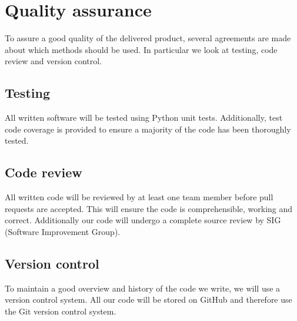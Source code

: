 \section{Quality assurance}

To assure a good quality of the delivered product, several agreements are made about which methods should be used. In particular we look at testing, code review and version control.

\subsection{Testing}
All written software will be tested using Python unit tests. Additionally, test code coverage is provided to ensure a majority of the code has been thoroughly tested.

\subsection{Code review}
All written code will be reviewed by at least one team member before pull requests are accepted. This will ensure the code is comprehensible, working and correct. Additionally our code will undergo a complete source review by SIG (Software Improvement Group).

\subsection{Version control}
To maintain a good overview and history of the code we write, we will use a version control system. All our code will be stored on GitHub and therefore use the Git version control system.
